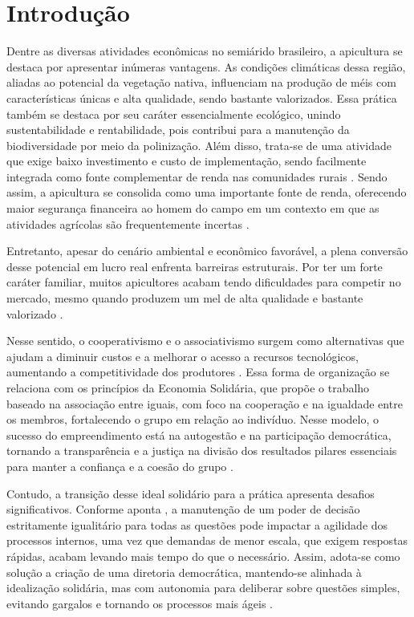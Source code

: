 \chapter{Introdução}
\label{cap:introducao}

Dentre as diversas atividades econômicas no semiárido brasileiro, a apicultura se destaca por apresentar inúmeras vantagens. As condições climáticas dessa região, aliadas ao potencial da vegetação nativa, influenciam na produção de méis com características únicas e alta qualidade, sendo bastante valorizados. Essa prática também se destaca por seu caráter essencialmente ecológico, unindo sustentabilidade e rentabilidade, pois contribui para a manutenção da biodiversidade por meio da polinização. Além disso, trata-se de uma atividade que exige baixo investimento e custo de implementação, sendo facilmente integrada como fonte complementar de renda nas comunidades rurais \cite{veras2025}. Sendo assim, a apicultura se consolida como uma importante fonte de renda, oferecendo maior segurança financeira ao homem do campo em um contexto em que as atividades agrícolas são frequentemente incertas \cite{araujo2024}.

Entretanto, apesar do cenário ambiental e econômico favorável, a plena conversão desse potencial em lucro real enfrenta barreiras estruturais. Por ter um forte caráter familiar, muitos apicultores acabam tendo dificuldades para competir no mercado, mesmo quando produzem um mel de alta qualidade e bastante valorizado \cite{veras2025}.

Nesse sentido, o cooperativismo e o associativismo surgem como alternativas que ajudam a diminuir custos e a melhorar o acesso a recursos tecnológicos, aumentando a competitividade dos produtores \cite{barbosa2020}. Essa forma de organização se relaciona com os princípios da Economia Solidária, que propõe o trabalho baseado na associação entre iguais, com foco na cooperação e na igualdade entre os membros, fortalecendo o grupo em relação ao indivíduo. Nesse modelo, o sucesso do empreendimento está na autogestão e na participação democrática, tornando a transparência e a justiça na divisão dos resultados pilares essenciais para manter a confiança e a coesão do grupo \cite{singer2002}.

Contudo, a transição desse ideal solidário para a prática apresenta desafios significativos. Conforme aponta , a manutenção de um poder de decisão estritamente igualitário para todas as questões pode impactar a agilidade dos processos internos, uma vez que demandas de menor escala, que exigem respostas rápidas, acabam levando mais tempo do que o necessário. Assim, adota-se como solução a criação de uma diretoria democrática, mantendo-se alinhada à idealização solidária, mas com autonomia para deliberar sobre questões simples, evitando gargalos e tornando os processos mais ágeis \cite{aguiar2026}.

